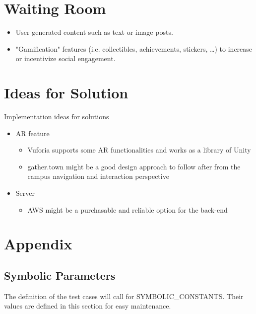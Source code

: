 \documentclass[12pt]{article}
\begin{document}
\section{Waiting Room}
\begin{itemize}
  \item User generated content such as text or image posts.
  \item "Gamification" features (i.e. collectibles, achievements, stickers, \dots) to increase or incentivize social engagement.
\end{itemize}
\section{Ideas for Solution}
Implementation ideas for solutions
\begin{itemize}
\item AR feature
	\begin{itemize}
	\item Vuforia supports some AR functionalities and works as a library of Unity
	\item gather.town might be a good design approach to follow after from the campus navigation and interaction perspective
	\end{itemize}
\item Server
	\begin{itemize}
	\item AWS might be a purchasable and reliable option for the back-end
	\end{itemize}
\end{itemize}

\newpage{}

\section{Appendix}
\subsection{Symbolic Parameters}
The definition of the test cases will call for SYMBOLIC\_CONSTANTS.
Their values are defined in this section for easy maintenance.
\end{document}
